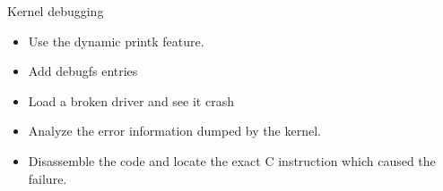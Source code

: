 \setuplabframe
{Kernel debugging}
{
  \begin{itemize}
  \item Use the dynamic printk feature.
  \item Add debugfs entries
  \item Load a broken driver and see it crash
  \item Analyze the error information dumped by the kernel.
  \item Disassemble the code and locate the exact C instruction which
    caused the failure.
  \end{itemize}
}
